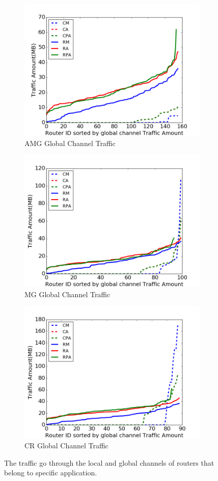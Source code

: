 \documentclass[conference,compsoc]{IEEEtran}
\begin{document}
\begin{figure}[t]
    \centering
    \begin{subfigure}[t]{0.32\textwidth}
        \centering
        \includegraphics[height=1.8 in]{wkld/amg/gc-traffic}
        \caption{AMG Global Channel Traffic}
        \label{fig:amg-gc-traffic}
    \end{subfigure}\hfill
    \hspace{1em}%
    \begin{subfigure}[t]{0.32\textwidth}
        \centering
        \includegraphics[height=1.8 in]{wkld/mg/gc-traffic}
        \caption{MG Global Channel Traffic}
        \label{fig:mg-gc-traffic}
    \end{subfigure}\hfill
    \begin{subfigure}[t]{0.32\textwidth}
        \centering
        \includegraphics[height=1.8 in]{wkld/cr/gc-traffic}
        \caption{CR Global Channel Traffic}
        \label{fig:cr-gc-traffic}
    \end{subfigure}%
   \caption{The traffic go through the local and global channels of routers that belong to specific application.}
   \label{fig:3app-lc-gc-traffic}
\end{figure}
\end{document}
